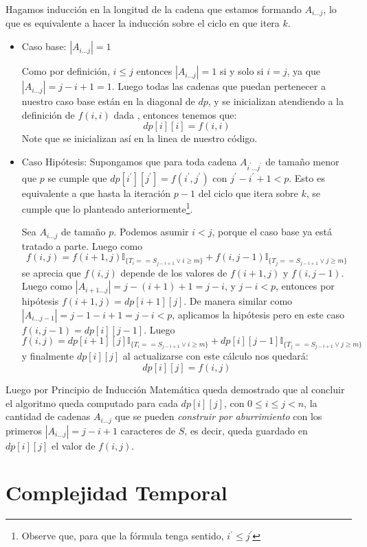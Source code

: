 \documentclass[a4paper]{article}
\begin{document}
	Hagamos inducción en la longitud de la cadena que estamos formando $A_{i...j}$, lo que es equivalente a hacer la inducción sobre el ciclo en que itera $k$.
	
	\begin{itemize}
		\item Caso base: $|A_{i...j}| = 1$
		
		Como por definición, $i \leq j$ entonces $|A_{i...j}| = 1$ si y solo si $i = j$, ya que $|A_{i...j}| = j-i + 1 = 1$.
		Luego todas las cadenas que puedan pertenecer a nuestro caso base están en la diagonal de $dp$, y se inicializan atendiendo a la definición de $f(i, i)$ dada , entonces tenemos que:
		$$dp[i][i] = f(i, i)$$
		Note que se inicializan así en la linea  de nuestro código.
		
		\item Caso Hipótesis: Supongamos que para toda cadena $A_{i^\prime...j^\prime}$ de tamaño menor que $p$ se cumple que $dp[i^\prime][j^\prime] = f(i^\prime, j^\prime)$ con $j^\prime - i^\prime + 1 < p$. Esto es equivalente a que hasta la iteración $p-1$ del ciclo que itera sobre $k$, se cumple que lo planteado anteriormente\footnote{Observe que, para que la fórmula tenga sentido, $i^\prime \leq j^\prime$}.
		
		Sea $A_{i...j}$ de tamaño $p$. Podemos asumir $i<j$, porque el caso base ya está tratado a parte. Luego como
		$$f(i,j) = f(i+1,j)\mathbb{I}_{ \{T_i == S_{j-i+1} \vee i \geq m \}}  +  f(i,j-1)\mathbb{I}_{ \{T_j == S_{j-i+1} \vee j \geq m \} } $$
		se aprecia que $f(i,j)$ depende de los valores de $f(i+1,j)$ y $f(i,j-1)$. Luego como $|A_{i+1...j}| = j-(i+1) + 1 = j-i$, y $j-i < p$, entonces por hipótesis $f(i+1,j) = dp[i+1][j]$. De manera similar como $|A_{i...j-1}| = j-1 - i + 1 = j-i < p$, aplicamos la hipótesis pero en este caso $f(i,j-1) = dp[i][j-1]$.
		Luego
		$$f(i,j) = dp[i+1][j]\mathbb{I}_{ \{T_i == S_{j-i+1} \vee i \geq m \}}  +  dp[i][j-1]\mathbb{I}_{ \{T_j == S_{j-i+1} \vee j \geq m \} } $$
		y finalmente $dp[i][j]$ al actualizarse con este cálculo nos quedará:
		$$dp[i][j] = f(i,j)$$				
	\end{itemize}

	Luego por Principio de Inducción Matemática queda demostrado que al concluir el algoritmo queda computado para cada $dp[i][j]$, con $0 \leq i\leq j < n$, la cantidad de cadenas $A_{i...j}$ que se pueden \textit{construir por aburrimiento} con los primeros $|A_{i...j}| = j-i+1$ caracteres de $S$, es decir, queda guardado en $dp[i][j]$ el valor de $f(i,j)$.	
	
	\section*{Complejidad Temporal}
	
	
\end{document}
